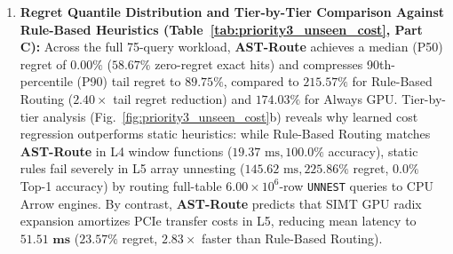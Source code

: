 \documentclass[10pt,a4paper]{article}
\begin{document}
\begin{enumerate}[leftmargin=1.5em,itemsep=2pt]
    \item \textbf{Regret Quantile Distribution and Tier-by-Tier Comparison Against Rule-Based Heuristics (Table~\ref{tab:priority3_unseen_cost}, Part C):} Across the full 75-query workload, \textbf{AST-Route} achieves a median (P50) regret of $\mathbf{0.00\%}$ ($58.67\%$ zero-regret exact hits) and compresses 90th-percentile (P90) tail regret to $\mathbf{89.75\%}$, compared to $215.57\%$ for Rule-Based Routing ($2.40\times$ tail regret reduction) and $174.03\%$ for Always GPU. Tier-by-tier analysis (Fig.~\ref{fig:priority3_unseen_cost}b) reveals why learned cost regression outperforms static heuristics: while Rule-Based Routing matches \textbf{AST-Route} in L4 window functions ($19.37\text{ ms}, 100.0\%$ accuracy), static rules fail severely in L5 array unnesting ($145.62\text{ ms}, 225.86\%$ regret, $0.0\%$ Top-1 accuracy) by routing full-table $6.00\times 10^6$-row \texttt{UNNEST} queries to CPU Arrow engines. By contrast, \textbf{AST-Route} predicts that SIMT GPU radix expansion amortizes PCIe transfer costs in L5, reducing mean latency to $\mathbf{51.51\text{ ms}}$ ($23.57\%$ regret, $\mathbf{2.83\times}$ faster than Rule-Based Routing).
\end{enumerate}
\end{document}

